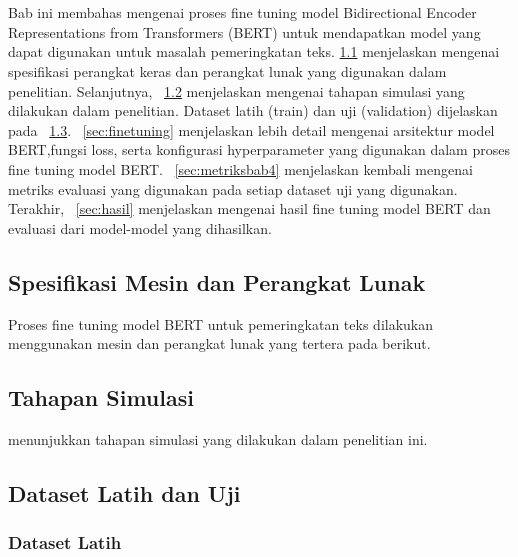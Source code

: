 \chapter{\babEmpat}
\label{bab:4}

Bab ini membahas mengenai proses fine tuning model Bidirectional Encoder Representations from Transformers (BERT) untuk mendapatkan model yang dapat digunakan untuk masalah pemeringkatan teks.
\sect\ref{sec:spesifikasi} menjelaskan mengenai spesifikasi perangkat keras dan perangkat lunak yang digunakan dalam penelitian. Selanjutnya, \sect~\ref{sec:simulasi} menjelaskan mengenai tahapan simulasi yang dilakukan dalam penelitian. Dataset latih (train) dan uji (validation) dijelaskan pada \sect~\ref{sec:dataset}. \sect~\ref{sec:finetuning} menjelaskan lebih detail mengenai arsitektur model BERT,fungsi loss, serta konfigurasi hyperparameter yang digunakan dalam proses fine tuning model BERT. \sect~\ref{sec:metriksbab4} menjelaskan kembali mengenai metriks evaluasi yang digunakan pada setiap dataset uji yang digunakan. Terakhir, \sect~\ref{sec:hasil} menjelaskan mengenai hasil fine tuning model BERT dan evaluasi dari model-model yang dihasilkan.


\section{Spesifikasi Mesin dan Perangkat Lunak}
\label{sec:spesifikasi}


Proses fine tuning model BERT untuk pemeringkatan teks dilakukan menggunakan mesin dan perangkat lunak yang tertera pada  berikut.


\section{Tahapan Simulasi}
\label{sec:simulasi}

menunjukkan tahapan simulasi yang dilakukan dalam penelitian ini.




\section{Dataset Latih dan Uji}
\label{sec:dataset}

\subsection{Dataset Latih}
\label{sec:datasetlatih}

